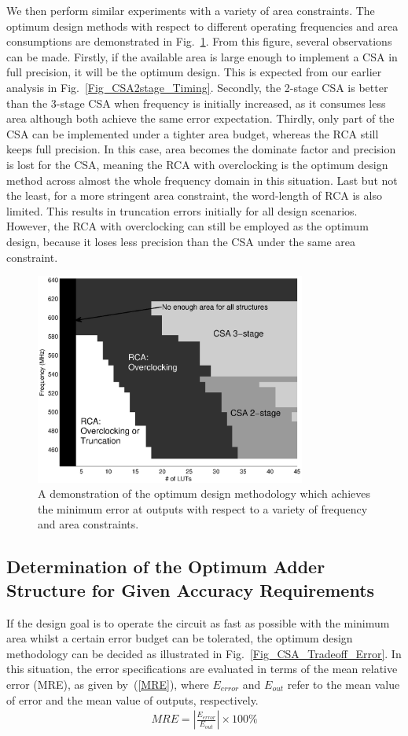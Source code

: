 \documentclass[prodmode,acmtrets]{acmsmall} %
\begin{document}
We then perform similar experiments with a variety of area constraints. The optimum design methods with respect to different operating frequencies and area consumptions are demonstrated in Fig.~\ref{Fig_CSA_Tradeoff}. From this figure, several observations can be made. Firstly, if the available area is large enough to implement a CSA in full precision, it will be the optimum design. This is expected from our earlier analysis in Fig.~\ref{Fig_CSA2stage_Timing}. Secondly, the 2-stage CSA is better than the 3-stage CSA when frequency is initially increased, as it consumes less area although both achieve the same error expectation. Thirdly, only part of the CSA can be implemented under a tighter area budget, whereas the RCA still keeps full precision. In this case, area becomes the dominate factor and precision is lost for the CSA, meaning the RCA with overclocking is the optimum design method across almost the whole frequency domain in this situation. Last but not the least, for a more stringent area constraint, the word-length of RCA is also limited. This results in truncation errors initially for all design scenarios. However, the RCA with overclocking can still be employed as the optimum design, because it loses less precision than the CSA under the same area constraint.

\begin{figure}[t]
  \centering
  \includegraphics[width=3.5in]{./Figures/Tradeoff.eps}
  \caption{A demonstration of the optimum design methodology which achieves the minimum error at outputs with respect to a variety of frequency and area constraints.}
  \label{Fig_CSA_Tradeoff}
\end{figure}

\subsection{Determination of the Optimum Adder Structure for Given Accuracy Requirements}
If the design goal is to operate the circuit as fast as possible with the minimum area whilst a certain error budget can be tolerated, the optimum design methodology can be decided as illustrated in Fig.~\ref{Fig_CSA_Tradeoff_Error}. In this situation, the error specifications are evaluated in terms of the mean relative error (MRE), as given by~(\ref{MRE}), where $E_{error}$ and $E_{out}$ refer to the mean value of error and the mean value of outputs, respectively.
%
\begin{eqnarray}\label{MRE}
  MRE=\left|\frac{E_{error}}{E_{out}}\right|\times 100\%
\end{eqnarray}
\end{document}
